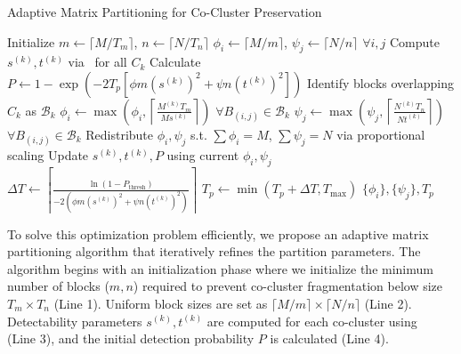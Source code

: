 \documentclass[journal]{IEEEtran}
\begin{document}
\begin{algorithm}[!t]
    \caption{Adaptive Matrix Partitioning for Co-Cluster Preservation}
    \label{alg:partitioning}
    \begin{algorithmic}[1]
        \STATE Initialize $m \gets \lceil M / T_m \rceil$, $n \gets \lceil N / T_n \rceil$ 
        \STATE $\phi_i \gets \lceil M/m \rceil$, $\psi_j \gets \lceil N/n \rceil$ $\forall i,j$ 
        \STATE Compute $s^{(k)}, t^{(k)}$ via~ for all $C_k$
        \STATE Calculate $P \gets 1 - \exp\left( -2 T_p \left[ \phi m (s^{(k)})^2 + \psi n (t^{(k)})^2 \right] \right)$
        \STATE Identify blocks overlapping $C_k$ as $\mathcal{B}_k$
        \STATE $\phi_i \gets \max\left( \phi_i, \left\lceil \frac{M^{(k)} T_m}{M s^{(k)}} \right\rceil \right)$ $\forall B_{(i,j)} \in \mathcal{B}_k$
        \STATE $\psi_j \gets \max\left( \psi_j, \left\lceil \frac{N^{(k)} T_n}{N t^{(k)}} \right\rceil \right)$ $\forall B_{(i,j)} \in \mathcal{B}_k$
        \ENDFOR
        \STATE Redistribute $\phi_i, \psi_j$ s.t. $\sum \phi_i = M$, $\sum \psi_j = N$ via proportional scaling
        \STATE Update $s^{(k)}, t^{(k)}, P$ using current $\phi_i, \psi_j$
        \STATE $\Delta T \gets \left\lceil \frac{\ln(1 - P_{\text{thresh}})}{-2 \left( \phi m (s^{(k)})^2 + \psi n (t^{(k)})^2 \right)} \right\rceil$
        \STATE $T_p \gets \min(T_p + \Delta T, T_{\text{max}})$
        \ENDIF
        \ENDWHILE
        \RETURN $\{\phi_i\}, \{\psi_j\}, T_p$
    \end{algorithmic}
\end{algorithm}

To solve this optimization problem efficiently, we propose an adaptive matrix partitioning algorithm that iteratively refines the partition parameters. The algorithm begins with an initialization phase where we initialize the minimum number of blocks ($m,n$) required to prevent co-cluster fragmentation below size $T_m \times T_n$ (Line 1). Uniform block sizes are set as $\lceil M/m \rceil \times \lceil N/n \rceil$ (Line 2). Detectability parameters $s^{(k)}, t^{(k)}$ are computed for each co-cluster using~ (Line 3), and the initial detection probability $P$ is calculated (Line 4).
\end{document}
